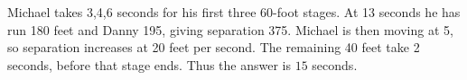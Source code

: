 Michael takes 3,4,6 seconds for his first three 60-foot stages. At 13 seconds he has run 180 feet and Danny 195, giving separation 375. Michael is then moving at 5, so separation increases at 20 feet per second. The remaining 40 feet take 2 seconds, before that stage ends. Thus the answer is $\boxed{15}$ seconds.
